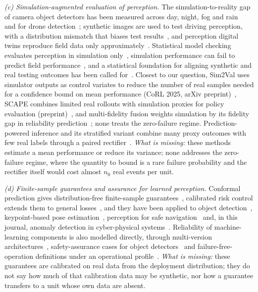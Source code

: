 \emph{(c) Simulation-augmented evaluation of perception.} The simulation-to-reality gap of camera object detectors has been
measured across day, night, fog and rain~\cite{reway2020simgap} and for drone detection~\cite{dieter2023drone}; synthetic
images are used to test driving perception, with a distribution mismatch that biases test
results~\cite{amini2024translators}, and perception digital twins reproduce field data only
approximately~\cite{saad2025dtperception}. Statistical model checking evaluates perception in simulation
only~\cite{barbier2019smc}, simulation performance can fail to predict field performance~\cite{kadian2020}, and a
statistical foundation for aligning synthetic and real testing outcomes has been called for~\cite{zhao2025statfoundation}.
Closest to our question, Sim2Val uses simulator outputs as control variates to reduce the number of real samples needed
for a confidence bound on mean performance (CoRL 2025, arXiv preprint)~\cite{luo2025sim2val}, SCAPE combines limited real rollouts with
simulation proxies for policy evaluation (preprint)~\cite{zhu2026scape}, and multi-fidelity fusion weights simulation by
its fidelity gap in reliability prediction~\cite{wang2026fusion}; none treats the zero-failure regime.
Prediction-powered inference and its stratified variant combine many proxy outcomes with few real labels through a paired
rectifier~\cite{angelopoulos2023ppi,fisch2024stratppi}. \emph{What is missing:} these methods estimate a mean performance
or reduce its variance; none addresses the zero-failure regime, where the quantity to bound is a rare failure probability
and the rectifier itself would cost almost $n_0$ real events per unit.

\emph{(d) Finite-sample guarantees and assurance for learned perception.} Conformal prediction gives distribution-free finite-sample
guarantees~\cite{angelopoulos2023gentle}, calibrated risk control extends them to general losses~\cite{angelopoulos2025ltt},
and they have been applied to object detection~\cite{degrancey2022conformaldet}, keypoint-based pose
estimation~\cite{yang2023purse}, perception for safe navigation~\cite{mei2025pwc} and, in this journal, anomaly detection in
cyber-physical systems~\cite{yuan2026conformal}. Reliability of machine-learning components is also modelled directly,
through multi-version architectures~\cite{wen2025nversion}, safety-assurance cases for object
detectors~\cite{paterson2025amlas} and failure-free-operation definitions under an operational
profile~\cite{aghazadeh2026hipllm}. \emph{What is missing:} these guarantees are calibrated on real data from the
deployment distribution; they do not say how much of that calibration data may be synthetic, nor how a guarantee
transfers to a unit whose own data are absent.
